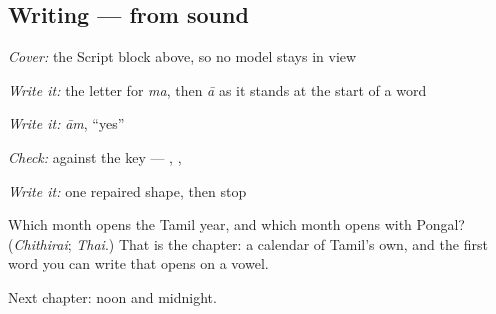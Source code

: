 \subsection*{Writing — from sound}
\emph{Cover:} the Script block above, so no model stays in view

\emph{Write it:} the letter for \emph{ma}, then \emph{ā} as it stands at the start of a word

\emph{Write it:} \emph{ām}, \textquotedblleft{}yes\textquotedblright{}

\emph{Check:} against the key — \textbf{}, \textbf{}, \textbf{}

\emph{Write it:} one repaired shape, then stop

\begin{tcolorbox}[breakable,colback=teal!4,colframe=teal!35!black,title={Before you move on}]
Which month opens the Tamil year, and which month opens with Pongal? (\emph{Chithirai}; \emph{Thai}.) That is the chapter: a calendar of Tamil's own, and the first word you can write that opens on a vowel.

Next chapter: noon and midnight.
\end{tcolorbox}
